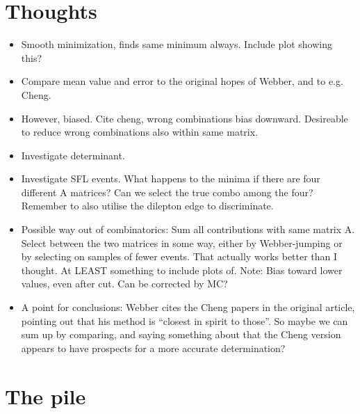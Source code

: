 \documentclass[twoside,english]{uiofysmaster}
\begin{document}
\section{Thoughts}

\begin{itemize}
\item Smooth minimization, finds same minimum always. Include plot showing this?
\item Compare mean value and error to the original hopes of Webber, and to e.g. Cheng. 
\item However, biased. Cite cheng, wrong combinations bias downward. Desireable to reduce wrong combinations also within same matrix.
\item Investigate determinant.
\item Investigate SFL events. What happens to the minima if there are four different A matrices? Can we select the true combo among the four? Remember to also utilise the dilepton edge to discriminate.
\item Possible way out of combinatorics: Sum all contributions with same matrix A. Select between the two matrices in some way, either by Webber-jumping or by selecting on samples of fewer events. That actually works better than I thought. At LEAST something to include plots of. Note: Bias toward lower values, even after cut. Can be corrected by MC? 
\item A point for conclusions: Webber cites the Cheng papers in the original article, pointing out that his method is ``closest in spirit to those''. So maybe we can sum up by comparing, and saying something about that the Cheng version appears to have prospects for a more accurate determination?
\end{itemize}
















\clearpage
\section{The pile}
\end{document}
